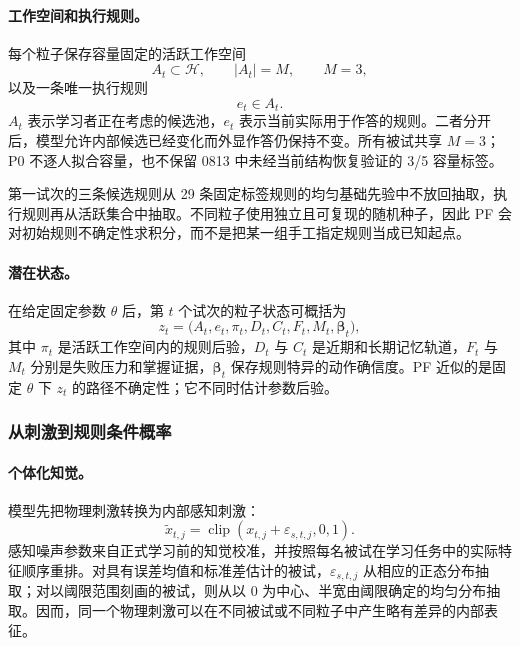 \paragraph{工作空间和执行规则。}
每个粒子保存容量固定的活跃工作空间
\begin{equation}
A_t\subset\mathcal H,
\qquad |A_t|=M,
\qquad M=3,
\label{eq:m0815-active-set}
\end{equation}
以及一条唯一执行规则
\begin{equation}
e_t\in A_t.
\label{eq:m0815-executed-rule}
\end{equation}
$A_t$ 表示学习者正在考虑的候选池，$e_t$ 表示当前实际用于作答的规则。二者分开后，模型允许内部候选已经变化而外显作答仍保持不变。所有被试共享 $M=3$；P0 不逐人拟合容量，也不保留 0813 中未经当前结构恢复验证的 3/5 容量标签。

第一试次的三条候选规则从 29 条固定标签规则的均匀基础先验中不放回抽取，执行规则再从活跃集合中抽取。不同粒子使用独立且可复现的随机种子，因此 PF 会对初始规则不确定性求积分，而不是把某一组手工指定规则当成已知起点。

\paragraph{潜在状态。}
在给定固定参数 $\theta$ 后，第 $t$ 个试次的粒子状态可概括为
\begin{equation}
z_t=
\bigl(A_t,e_t,\pi_t,D_t,C_t,F_t,M_t,\boldsymbol\beta_t\bigr),
\label{eq:m0815-latent-state}
\end{equation}
其中 $\pi_t$ 是活跃工作空间内的规则后验，$D_t$ 与 $C_t$ 是近期和长期记忆轨道，$F_t$ 与 $M_t$ 分别是失败压力和掌握证据，$\boldsymbol\beta_t$ 保存规则特异的动作确信度。PF 近似的是固定 $\theta$ 下 $z_t$ 的路径不确定性；它不同时估计参数后验。


\subsubsection{从刺激到规则条件概率}

\paragraph{个体化知觉。}
模型先把物理刺激转换为内部感知刺激：
\begin{equation}
\widetilde x_{t,j}
=\operatorname{clip}(x_{t,j}+\varepsilon_{s,t,j},0,1).
\label{eq:m0815-perception}
\end{equation}
感知噪声参数来自正式学习前的知觉校准，并按照每名被试在学习任务中的实际特征顺序重排。对具有误差均值和标准差估计的被试，$\varepsilon_{s,t,j}$ 从相应的正态分布抽取；对以阈限范围刻画的被试，则从以 0 为中心、半宽由阈限确定的均匀分布抽取。因而，同一个物理刺激可以在不同被试或不同粒子中产生略有差异的内部表征。

